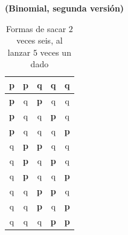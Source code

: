 \begin{Ejemplo}{\bf (Binomial, segunda versión)}
\begin{table}[htbp]
\begin{center}
\begin{tabular}{|c|c|c|c|c|}
            \hline
             \rule{0cm}{0.5cm}\mbox{\large\bf p}&\mbox{\large\bf p}&q & q&q \\
            \hline
             \rule{0cm}{0.5cm}\mbox{\large\bf p}&q& \mbox{\large\bf p}&q &q \\
            \hline
             \rule{0cm}{0.5cm}\mbox{\large\bf p}&q&q &\mbox{\large\bf p} & q\\
            \hline
             \rule{0cm}{0.5cm}\mbox{\large\bf p}&q&q & q&\mbox{\large\bf p} \\
            \hline
             \rule{0cm}{0.5cm}q&\mbox{\large\bf p}& \mbox{\large\bf p}&q & q\\
            \hline
             \rule{0cm}{0.5cm}q&\mbox{\large\bf p}&q &\mbox{\large\bf p} & q\\
            \hline
             \rule{0cm}{0.5cm}q&\mbox{\large\bf p}&q &q & \mbox{\large\bf p}\\
            \hline
             \rule{0cm}{0.5cm}q&q& \mbox{\large\bf p}&\mbox{\large\bf p} &q \\
             \hline
             \rule{0cm}{0.5cm}q&q& \mbox{\large\bf p}& q & \mbox{\large\bf p} \\
             \hline
              \rule{0cm}{0.5cm}q&q&q& \mbox{\large\bf p}& \mbox{\large\bf p} \\
             \hline
             \end{tabular}
        \caption{Formas de sacar $2$ veces seis, al lanzar $5$ veces un dado}\label{cap05:tabla:FormasSacarDosVecesSeisCincoTiradasDado}
        \end{center}
        \end{table}


\end{Ejemplo}

